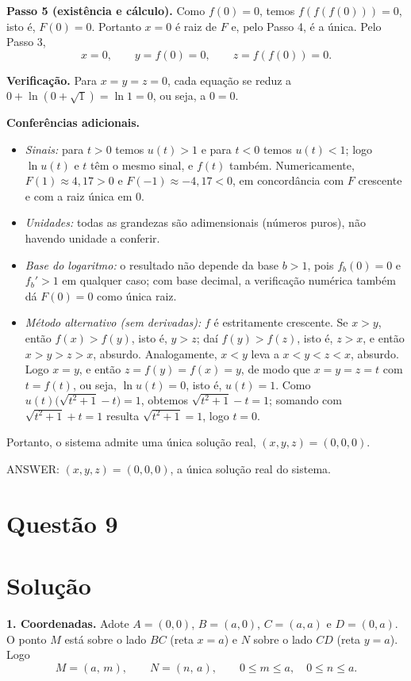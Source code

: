 \documentclass{article}%
\begin{document}
\textbf{Passo 5 (existência e cálculo).} Como $f(0)=0$, temos $f(f(f(0)))=0$, isto é, $F(0)=0$. Portanto $x=0$ é raiz de $F$ e, pelo Passo 4, é a única. Pelo Passo 3,
\[
x=0, \qquad y=f(0)=0, \qquad z=f(f(0))=0.
\]

\textbf{Verificação.} Para $x=y=z=0$, cada equação se reduz a $0+\ln\left(0+\sqrt{1}\right)=\ln 1=0$, ou seja, a $0=0$.

\textbf{Conferências adicionais.}
\begin{itemize}
\item \textit{Sinais:} para $t>0$ temos $u(t)>1$ e para $t<0$ temos $u(t)<1$; logo $\ln u(t)$ e $t$ têm o mesmo sinal, e $f(t)$ também. Numericamente, $F(1)\approx 4{,}17>0$ e $F(-1)\approx -4{,}17<0$, em concordância com $F$ crescente e com a raiz única em $0$.
\item \textit{Unidades:} todas as grandezas são adimensionais (números puros), não havendo unidade a conferir.
\item \textit{Base do logaritmo:} o resultado não depende da base $b>1$, pois $f_b(0)=0$ e $f_b'>1$ em qualquer caso; com base decimal, a verificação numérica também dá $F(0)=0$ como única raiz.
\item \textit{Método alternativo (sem derivadas):} $f$ é estritamente crescente. Se $x>y$, então $f(x)>f(y)$, isto é, $y>z$; daí $f(y)>f(z)$, isto é, $z>x$, e então $x>y>z>x$, absurdo. Analogamente, $x<y$ leva a $x<y<z<x$, absurdo. Logo $x=y$, e então $z=f(y)=f(x)=y$, de modo que $x=y=z=t$ com $t=f(t)$, ou seja, $\ln u(t)=0$, isto é, $u(t)=1$. Como $u(t)\big(\sqrt{t^2+1}-t\big)=1$, obtemos $\sqrt{t^2+1}-t=1$; somando com $\sqrt{t^2+1}+t=1$ resulta $\sqrt{t^2+1}=1$, logo $t=0$.
\end{itemize}

Portanto, o sistema admite uma única solução real, $(x,y,z)=(0,0,0)$.

ANSWER: $(x,y,z)=(0,0,0)$, a única solução real do sistema.%
\newpage%
\section*{Questão 9}

\section*{Solução}

\textbf{1. Coordenadas.} Adote $A=(0,0)$, $B=(a,0)$, $C=(a,a)$ e $D=(0,a)$. O ponto $M$ está sobre o lado $BC$ (reta $x=a$) e $N$ sobre o lado $CD$ (reta $y=a$). Logo
\[
M=(a,\,m), \qquad N=(n,\,a), \qquad 0\le m\le a, \quad 0\le n\le a .
\]
\end{document}
